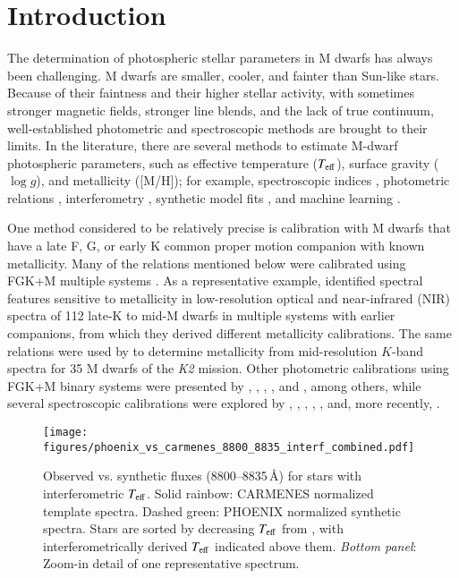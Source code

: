 \documentclass{aa}
\begin{document}
\section{Introduction}
\label{introduction}

The determination of photospheric stellar parameters in M dwarfs has always been challenging. 
M dwarfs are smaller, cooler, and fainter than Sun-like stars. 
Because of their faintness and their higher stellar activity, with sometimes stronger magnetic fields, stronger line blends, and the lack of true continuum, well-established photometric and spectroscopic methods are brought to their limits. 
In the literature, there are several methods to estimate M-dwarf photospheric parameters, such as effective temperature ($T_{\rm eff}$), surface gravity ($\log{g}$), and metallicity ([M/H]); for example, spectroscopic indices \citep[see][]{RojasAyala2012,GaidosMann2014}, photometric relations \citep[see][]{Dittmann2016,Houdebine2019}, interferometry \citep[see][]{Boyajian2012,vonBraun2014,Rabus2019}, synthetic model fits \citep[see][]{Gaidos2014,Passegger2018,marfil2021carmenes}, and machine learning \citep[ML; see][]{Antoniadis2020,Passegger2020}.

One method considered to be relatively precise is calibration with M dwarfs that have a late F, G, or early K common proper motion companion with known metallicity. 
Many of the relations mentioned below were calibrated using FGK+M multiple systems \citep[e.g.,][]{Newton2014}. As a representative example, \cite{Mann2013a} identified spectral features sensitive to metallicity in low-resolution optical and near-infrared (NIR) spectra of 112 late-K to mid-M dwarfs in multiple systems with earlier companions, from which they derived different metallicity calibrations. 
The same relations were used by \cite{Rodriguez2019} to determine metallicity from mid-resolution $K$-band spectra for 35 M dwarfs of the {\it K2} mission. 
Other photometric calibrations using FGK+M binary systems were presented by \cite{Bonfils2005}, \cite{Casagrande2008}, \cite{JohnsonApps2009}, \cite{SchlaufmanLaughlin2010}, and \cite{Neves2012}, among others, while several spectroscopic calibrations were explored by \cite{Rojas-Ayala2010}, \cite{Dhital2012}, \cite{Terrien2012}, \cite{Mann2014}, \cite{Mann2015}, and, more recently, \cite{Montes2018}.

\begin{figure}
    \centering
    \texttt{[image: figures/phoenix\_vs\_carmenes\_8800\_8835\_interf\_combined.pdf]}
    \caption{Observed vs. synthetic fluxes (8800--8835\,\r{A}) for stars with interferometric $T_{\rm eff}$.
    Solid rainbow: CARMENES normalized template spectra.
    Dashed green: PHOENIX normalized synthetic spectra.
    Stars are sorted by decreasing $T_{\rm eff}$
    from \cite{Schweitzer2019}, with interferometrically derived $T_{\rm eff}$ indicated above them. 
    {\it Bottom panel}: Zoom-in detail of one representative spectrum.}
    \label{fig:spectra_interf}
\end{figure}
\end{document}
